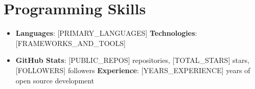\documentclass[letterpaper,11pt]{article}
\newcommand{\resumeSubHeadingListStart}{\begin{itemize}[leftmargin=*]}
\newcommand{\resumeSubHeadingListEnd}{\end{itemize}}
\begin{document}
\section{Programming Skills}
 \resumeSubHeadingListStart
   \item{
     \textbf{Languages}{: [PRIMARY_LANGUAGES]}
     \hfill
     \textbf{Technologies}{: [FRAMEWORKS_AND_TOOLS]}
   }
   \item{
     \textbf{GitHub Stats}{: [PUBLIC_REPOS] repositories, [TOTAL_STARS] stars, [FOLLOWERS] followers}
     \hfill
     \textbf{Experience}{: [YEARS_EXPERIENCE] years of open source development}
   }
 \resumeSubHeadingListEnd

\end{document}
